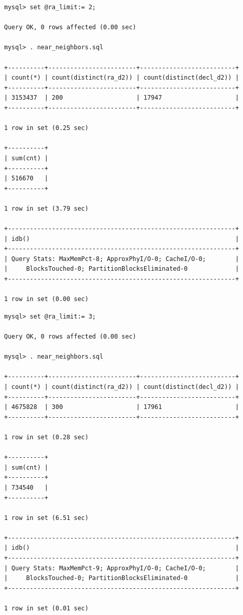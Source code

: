 \documentclass[DM,lsstdraft,toc]{lsstdoc}
\begin{document}
\begin{verbatim}
mysql> set @ra_limit:= 2;

Query OK, 0 rows affected (0.00 sec)

mysql> . near_neighbors.sql

+----------+------------------------+--------------------------+
| count(*) | count(distinct(ra_d2)) | count(distinct(decl_d2)) |
+----------+------------------------+--------------------------+
| 3153437  | 200                    | 17947                    |
+----------+------------------------+--------------------------+

1 row in set (0.25 sec)

+----------+
| sum(cnt) |
+----------+
| 516670   |
+----------+

1 row in set (3.79 sec)

+--------------------------------------------------------------+
| idb()                                                        |
+--------------------------------------------------------------+
| Query Stats: MaxMemPct-8; ApproxPhyI/O-0; CacheI/O-0;        |
|     BlocksTouched-0; PartitionBlocksEliminated-0             |
+--------------------------------------------------------------+

1 row in set (0.00 sec)
\end{verbatim}

\begin{verbatim}
mysql> set @ra_limit:= 3;

Query OK, 0 rows affected (0.00 sec)

mysql> . near_neighbors.sql

+----------+------------------------+--------------------------+
| count(*) | count(distinct(ra_d2)) | count(distinct(decl_d2)) |
+----------+------------------------+--------------------------+
| 4675828  | 300                    | 17961                    |
+----------+------------------------+--------------------------+

1 row in set (0.28 sec)

+----------+
| sum(cnt) |
+----------+
| 734540   |
+----------+

1 row in set (6.51 sec)

+--------------------------------------------------------------+
| idb()                                                        |
+--------------------------------------------------------------+
| Query Stats: MaxMemPct-9; ApproxPhyI/O-0; CacheI/O-0;        |
|     BlocksTouched-0; PartitionBlocksEliminated-0             |
+--------------------------------------------------------------+

1 row in set (0.01 sec)
\end{verbatim}
\end{document}
